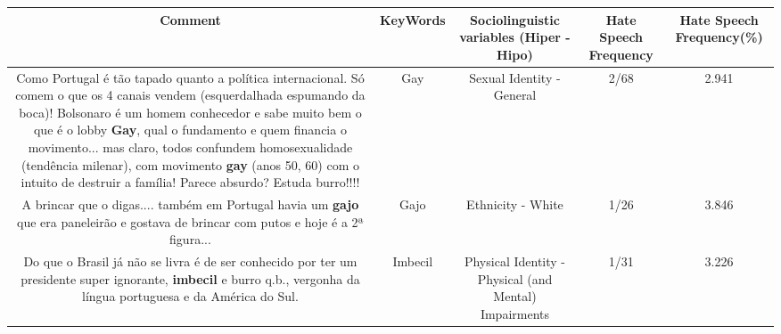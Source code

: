 \documentclass[11pt]{article}
\newlength\mylength
\begin{document}
\begin{center}
\setlength\mylength{\dimexpr\textwidth - 1\arrayrulewidth - 50\tabcolsep}
\begin{longtable}{|C{.65\mylength}|C{.30\mylength}|C{.12\mylength}|C{.12\mylength}|C{.12\mylength}|}
\hline
\textbf{Comment} & \textbf{KeyWords} & \textbf{Sociolinguistic variables (Hiper - Hipo)}  & \textbf{Hate Speech Frequency} & \textbf{Hate Speech Frequency(\%)} \\
\hline{}\small Como Portugal é tão tapado quanto a política internacional. Só comem o que os 4 canais vendem (esquerdalhada espumando da boca)! Bolsonaro é um homem conhecedor e sabe muito bem o que é o lobby \textbf{Gay}, qual o fundamento e quem financia o movimento... mas claro, todos confundem homosexualidade (tendência milenar), com movimento \textbf{gay} (anos 50, 60) com o intuito de destruir a família! Parece absurdo? Estuda burro!!!!\normalsize   & Gay & Sexual Identity - General & 2/68 & 2.941 \\  \hline
  \small A brincar que o digas.... também em Portugal havia um \textbf{gajo} que era paneleirão e gostava de brincar com putos e hoje é a 2ª figura...\normalsize   & Gajo & Ethnicity - White & 1/26 & 3.846 \\  \hline
  \small Do que o Brasil já não se livra é de ser conhecido por ter um presidente super ignorante, \textbf{imbecil} e burro q.b., vergonha da língua portuguesa e da América do Sul.\normalsize   & Imbecil & Physical Identity - Physical (and Mental) Impairments & 1/31 & 3.226 \\  \hline

\end{longtable}
\end{center}
\end{document}
